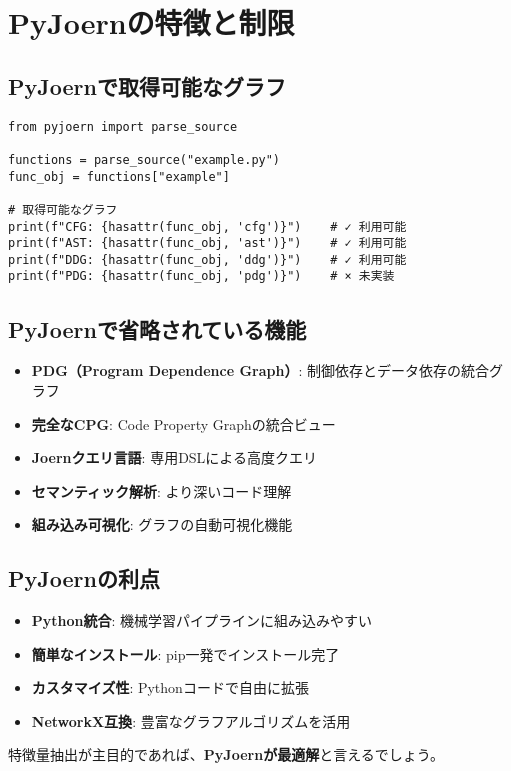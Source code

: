 \documentclass[12pt,a4paper]{article}
\begin{document}
\section{PyJoernの特徴と制限}

\subsection{PyJoernで取得可能なグラフ}

\begin{lstlisting}
from pyjoern import parse_source

functions = parse_source("example.py")
func_obj = functions["example"]

# 取得可能なグラフ
print(f"CFG: {hasattr(func_obj, 'cfg')}")    # ✓ 利用可能
print(f"AST: {hasattr(func_obj, 'ast')}")    # ✓ 利用可能
print(f"DDG: {hasattr(func_obj, 'ddg')}")    # ✓ 利用可能
print(f"PDG: {hasattr(func_obj, 'pdg')}")    # × 未実装
\end{lstlisting}

\subsection{PyJoernで省略されている機能}

\begin{itemize}
    \item \textbf{PDG（Program Dependence Graph）}: 制御依存とデータ依存の統合グラフ
    \item \textbf{完全なCPG}: Code Property Graphの統合ビュー
    \item \textbf{Joernクエリ言語}: 専用DSLによる高度クエリ
    \item \textbf{セマンティック解析}: より深いコード理解
    \item \textbf{組み込み可視化}: グラフの自動可視化機能
\end{itemize}

\subsection{PyJoernの利点}

\begin{itemize}
    \item \textbf{Python統合}: 機械学習パイプラインに組み込みやすい
    \item \textbf{簡単なインストール}: pip一発でインストール完了
    \item \textbf{カスタマイズ性}: Pythonコードで自由に拡張
    \item \textbf{NetworkX互換}: 豊富なグラフアルゴリズムを活用
\end{itemize}

特徴量抽出が主目的であれば、\textbf{PyJoernが最適解}と言えるでしょう。
\end{document}
